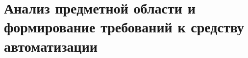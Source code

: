 \section{\large{Анализ предметной области и формирование требований к средству автоматизации}}





